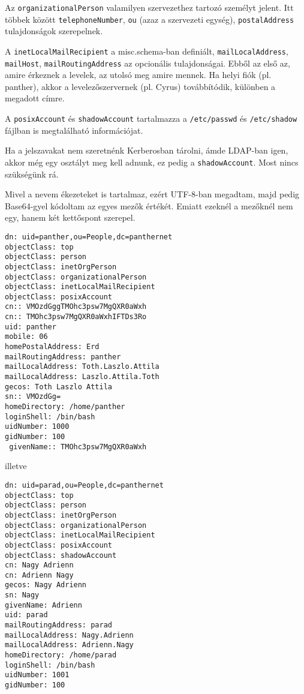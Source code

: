 Az \texttt{organizationalPerson} valamilyen szervezethez tartozó személyt jelent. Itt többek között
\texttt{telephoneNumber}, \texttt{ou} (azaz a szervezeti egység), \texttt{postalAddress} tulajdonságok szerepelnek.

A \texttt{inetLocalMailRecipient} a misc.schema-ban definiált, \texttt{mailLocalAddress}, \texttt{mailHost},
\texttt{mailRoutingAddress} az opcionális tulajdonságai. Ebből az első az, amire érkeznek a levelek, az utolsó meg
amire mennek. Ha helyi fiók (pl. panther), akkor a levelezőszervernek (pl. Cyrus) továbbítódik, különben a megadott
címre.

A \texttt{posixAccount} és \texttt{shadowAccount} tartalmazza a \texttt{/etc/passwd} és \texttt{/etc/shadow} fájlban
is megtalálható információjat.

Ha a jelszavakat nem szeretnénk Kerberosban tárolni, ámde LDAP-ban igen, akkor még egy osztályt meg kell adnunk, ez
pedig a \texttt{shadowAccount}. Most nincs szükségünk rá.

Mivel a nevem ékezeteket is tartalmaz, ezért UTF-8-ban megadtam, majd pedig Base64-gyel kódoltam az egyes mezők
értékét. Emiatt ezeknél a mezőknél nem egy, hanem két kettőspont szerepel.

\begin{Verbatim}[frame=single]
dn: uid=panther,ou=People,dc=panthernet
objectClass: top
objectClass: person
objectClass: inetOrgPerson
objectClass: organizationalPerson
objectClass: inetLocalMailRecipient
objectClass: posixAccount
cn:: VMOzdGggTMOhc3psw7MgQXR0aWxh
cn:: TMOhc3psw7MgQXR0aWxhIFTDs3Ro
uid: panther
mobile: 06
homePostalAddress: Erd
mailRoutingAddress: panther
mailLocalAddress: Toth.Laszlo.Attila
mailLocalAddress: Laszlo.Attila.Toth
gecos: Toth Laszlo Attila
sn:: VMOzdGg=
homeDirectory: /home/panther
loginShell: /bin/bash
uidNumber: 1000
gidNumber: 100
 givenName:: TMOhc3psw7MgQXR0aWxh
\end{Verbatim}

\noindent illetve

\begin{Verbatim}[frame=single]
dn: uid=parad,ou=People,dc=panthernet
objectClass: top
objectClass: person
objectClass: inetOrgPerson
objectClass: organizationalPerson
objectClass: inetLocalMailRecipient
objectClass: posixAccount
objectClass: shadowAccount
cn: Nagy Adrienn
cn: Adrienn Nagy
gecos: Nagy Adrienn
sn: Nagy
givenName: Adrienn
uid: parad
mailRoutingAddress: parad
mailLocalAddress: Nagy.Adrienn
mailLocalAddress: Adrienn.Nagy
homeDirectory: /home/parad
loginShell: /bin/bash
uidNumber: 1001
gidNumber: 100
\end{Verbatim}

